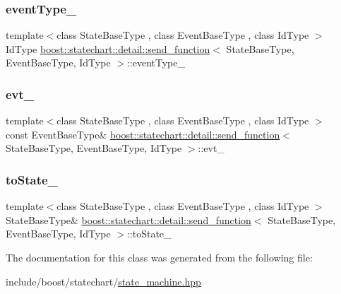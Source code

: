 \subsubsection{\texorpdfstring{event\+Type\+\_\+}{eventType\_}}
{\footnotesize\ttfamily template$<$class State\+Base\+Type , class Event\+Base\+Type , class Id\+Type $>$ \\
Id\+Type \mbox{\hyperlink{classboost_1_1statechart_1_1detail_1_1send__function}{boost\+::statechart\+::detail\+::send\+\_\+function}}$<$ State\+Base\+Type, Event\+Base\+Type, Id\+Type $>$\+::event\+Type\+\_\+\hspace{0.3cm}{\ttfamily [private]}}

\mbox{\label{classboost_1_1statechart_1_1detail_1_1send__function_a6d0b8117e992582ce82847c71120af7d}} 
\subsubsection{\texorpdfstring{evt\+\_\+}{evt\_}}
{\footnotesize\ttfamily template$<$class State\+Base\+Type , class Event\+Base\+Type , class Id\+Type $>$ \\
const Event\+Base\+Type\& \mbox{\hyperlink{classboost_1_1statechart_1_1detail_1_1send__function}{boost\+::statechart\+::detail\+::send\+\_\+function}}$<$ State\+Base\+Type, Event\+Base\+Type, Id\+Type $>$\+::evt\+\_\+\hspace{0.3cm}{\ttfamily [private]}}

\mbox{\label{classboost_1_1statechart_1_1detail_1_1send__function_af41e78b5674d4606b96203c9e888f6f2}} 
\subsubsection{\texorpdfstring{to\+State\+\_\+}{toState\_}}
{\footnotesize\ttfamily template$<$class State\+Base\+Type , class Event\+Base\+Type , class Id\+Type $>$ \\
State\+Base\+Type\& \mbox{\hyperlink{classboost_1_1statechart_1_1detail_1_1send__function}{boost\+::statechart\+::detail\+::send\+\_\+function}}$<$ State\+Base\+Type, Event\+Base\+Type, Id\+Type $>$\+::to\+State\+\_\+\hspace{0.3cm}{\ttfamily [private]}}



The documentation for this class was generated from the following file\+:\begin{DoxyCompactItemize}
\item 
include/boost/statechart/\mbox{\hyperlink{state__machine_8hpp}{state\+\_\+machine.\+hpp}}\end{DoxyCompactItemize}
